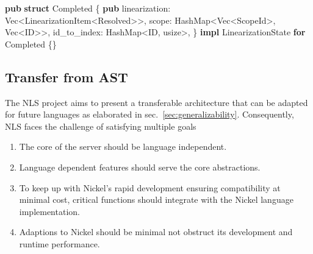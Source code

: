 \documentclass[
  a4paper,
  bibtex,
  english,
  nomenclature]{kthlatex/kththesis/kththesis}
\newenvironment{Shaded}{}{}
\newcommand{\DataTypeTok}[1]{\textcolor[rgb]{0.56,0.13,0.00}{#1}}
\newcommand{\KeywordTok}[1]{\textcolor[rgb]{0.00,0.44,0.13}{\textbf{#1}}}
\newcommand{\NormalTok}[1]{#1}
\newcommand{\OperatorTok}[1]{\textcolor[rgb]{0.40,0.40,0.40}{#1}}
\providecommand{\tightlist}{%
  \setlength{\itemsep}{0pt}\setlength{\parskip}{0pt}}
\begin{document}
\begin{codelisting}

\caption{Type Definition of Completed state}

\hypertarget{lst:nls-definition-completed-type}{%
\label{lst:nls-definition-completed-type}}%
\begin{Shaded}
\begin{Highlighting}[]
\KeywordTok{pub} \KeywordTok{struct}\NormalTok{ Completed }\OperatorTok{\{}
    \KeywordTok{pub}\NormalTok{ linearization}\OperatorTok{:} \DataTypeTok{Vec}\OperatorTok{\textless{}}\NormalTok{LinearizationItem}\OperatorTok{\textless{}}\NormalTok{Resolved}\OperatorTok{\textgreater{}\textgreater{},}
\NormalTok{    scope}\OperatorTok{:}\NormalTok{ HashMap}\OperatorTok{\textless{}}\DataTypeTok{Vec}\OperatorTok{\textless{}}\NormalTok{ScopeId}\OperatorTok{\textgreater{},} \DataTypeTok{Vec}\OperatorTok{\textless{}}\NormalTok{ID}\OperatorTok{\textgreater{}\textgreater{},}
\NormalTok{    id\_to\_index}\OperatorTok{:}\NormalTok{ HashMap}\OperatorTok{\textless{}}\NormalTok{ID}\OperatorTok{,} \DataTypeTok{usize}\OperatorTok{\textgreater{},}
\OperatorTok{\}}
\KeywordTok{impl}\NormalTok{ LinearizationState }\KeywordTok{for}\NormalTok{ Completed }\OperatorTok{\{\}}
\end{Highlighting}
\end{Shaded}

\end{codelisting}

\hypertarget{sec:transfer-from-ast}{%
\subsection{Transfer from AST}\label{sec:transfer-from-ast}}

The NLS project aims to present a transferable architecture that can be
adapted for future languages as elaborated in
sec.~\ref{sec:generalizability}. Consequently, NLS faces the challenge
of satisfying multiple goals

\begin{enumerate}
\def\labelenumi{\arabic{enumi}.}
\tightlist
\item
  The core of the server should be language independent.
\item
  Language dependent features should serve the core abstractions.
\item
  To keep up with Nickel's rapid development ensuring compatibility at
  minimal cost, critical functions should integrate with the Nickel
  language implementation.
\item
  Adaptions to Nickel should be minimal not obstruct its development and
  runtime performance.
\end{enumerate}
\end{document}
